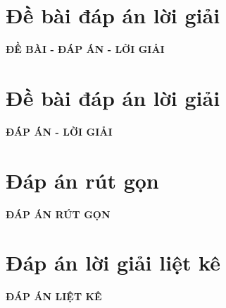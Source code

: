\documentclass[11pt]{article}
\begin{document}
\section{Đề bài đáp án lời giải}
\setcounter{page}{1}
\indebailoigiai
\lamtieude
\begin{center}
{\bf ĐỀ BÀI - ĐÁP ÁN - LỜI GIẢI}
\end{center}
\begin{enumerate}[]
\foreachproblem[bttracnghiem]{\item\thisproblem}
\end{enumerate}
\newpage
\section{Đề bài đáp án lời giải}
\setcounter{page}{1}
\inloigiai
\lamtieude
\begin{center}
{\bf ĐÁP ÁN - LỜI GIẢI}
\end{center}
\begin{enumerate}[]
\foreachproblem[bttracnghiem]{\item\thisproblem}
\end{enumerate}
\newpage
\section{Đáp án rút gọn}
\indapanrutgon
\lamtieude
\begin{center}
{\bf ĐÁP ÁN RÚT GỌN}
\end{center}
\begin{multicols}{3}
\begin{enumerate}[\causo]
\foreachproblem[bttracnghiem]{\item\thisproblem}
\end{enumerate}
\end{multicols}
\newpage
\section{Đáp án lời giải liệt kê}
\setcounter{page}{1}
\indapanlietke
\lamtieude
\thispagestyle{empty}
\begin{center}
{\bf ĐÁP ÁN LIỆT KÊ}
\end{center}
\begin{multicols}{3}
\begin{enumerate}[\causo]
\foreachproblem[bttracnghiem]{\item\thisproblem}
\end{enumerate}
\end{multicols}
\end{document}
